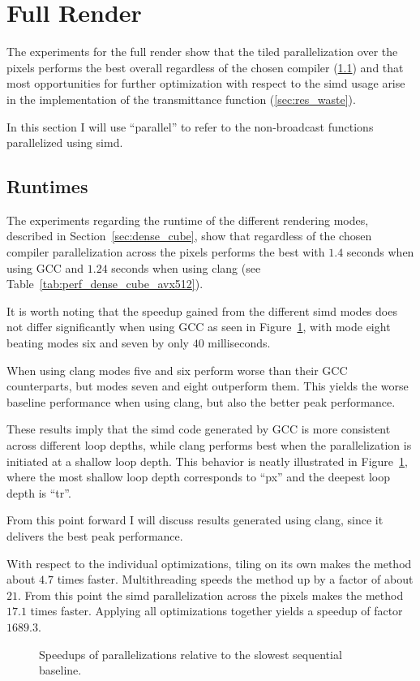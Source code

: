\documentclass[a4paper, 11pt]{memoir}
\begin{document}
    \section{Full Render}
    \label{sec:res_full_render}
    The experiments for the full render show that the tiled parallelization over the pixels performs the best overall
    regardless of the chosen compiler (\ref{sec:res_runtimes}) and that most opportunities for further optimization
    with respect to the \gls{simd} usage arise in the implementation of the transmittance function (\ref{sec:res_waste}).

    In this section I will use \enquote{parallel} to refer to the non-broadcast functions parallelized using \gls{simd}.

    \subsection{Runtimes}
    \label{sec:res_runtimes}
    The experiments regarding the runtime of the different rendering modes, described in Section~\ref{sec:dense_cube},
    show that regardless of the chosen compiler parallelization across the pixels performs the best with $1.4$ seconds
    when using GCC and $1.24$ seconds when using clang (see Table~\ref{tab:perf_dense_cube_avx512}).

    It is worth noting that the speedup gained from the different \gls{simd} modes does not differ significantly when using
    GCC as seen in Figure~\ref{fig:speedups}, with mode eight beating modes six and seven by only $40$ milliseconds.

    When using clang modes five and six perform worse than their GCC counterparts, but modes seven and eight outperform
    them. This yields the worse baseline performance when using clang, but also the better peak performance.

    These results imply that the \gls{simd} code generated by GCC is more consistent across different loop depths, while
    clang performs best when the parallelization is initiated at a shallow loop depth. This behavior is neatly illustrated
    in Figure~\ref{fig:speedups}, where the most shallow loop depth corresponds to \enquote{px} and the deepest loop depth
    is \enquote{tr}.

    From this point forward I will discuss results generated using clang, since it delivers the best peak performance.
    
    With respect to the individual optimizations, tiling on its own makes the method about $4.7$ times faster. Multithreading
    speeds the method up by a factor of about $21$. From this point the \gls{simd} parallelization across the pixels makes
    the method $17.1$ times faster. Applying all optimizations together yields a speedup of factor $1689.3$.
    \begin{figure}[t]
        \centering
        
        \caption{Speedups of parallelizations relative to the slowest sequential baseline.}
        \label{fig:speedups}
    \end{figure}
\end{document}
